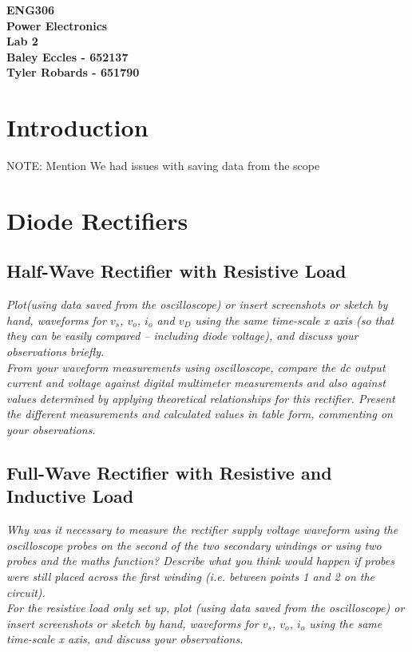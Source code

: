 \documentclass[12pt,a4paper]{article}
\begin{document}
\begin{center}
\textbf{\LARGE ENG306\\[6pt]
Power Electronics}\\[10pt]
\textbf{\large Lab 2\\[4pt]
Baley Eccles - 652137\\
Tyler Robards - 651790}\\
\end{center}

\tableofcontents
\newpage
\section{Introduction}
NOTE: Mention We had issues with saving data from the scope
\section{Diode Rectifiers}
\subsection{Half-Wave Rectifier with Resistive Load}
\textit{Plot(using data saved from the oscilloscope) or insert screenshots or sketch by hand, 
waveforms for $v_s$, $v_o$, $i_o$ and $v_D$ using the same time-scale x axis (so that they can be
easily compared – including diode voltage), and discuss your observations briefly.}\\


\textit{From your waveform measurements using oscilloscope, compare the dc output current 
and voltage against digital multimeter measurements and also against values determined by applying 
theoretical relationships for this rectifier. Present the different measurements and calculated 
values in table form, commenting on your observations.}\\


\subsection{Full-Wave Rectifier with Resistive and Inductive Load}
\textit{Why was it necessary to measure the rectifier supply voltage waveform using the oscilloscope
probes on the second of the two secondary windings or using two probes and the maths function?
Describe what you think would happen if probes were still placed across the first winding (i.e.
between points 1 and 2 on the circuit).}\\

\textit{For the resistive load only set up, plot (using data saved from the oscilloscope) or insert screenshots
or sketch by hand, waveforms for $v_s$, $v_o$, $i_o$ using the same time-scale x axis, and discuss your
observations.}\\
\end{document}
